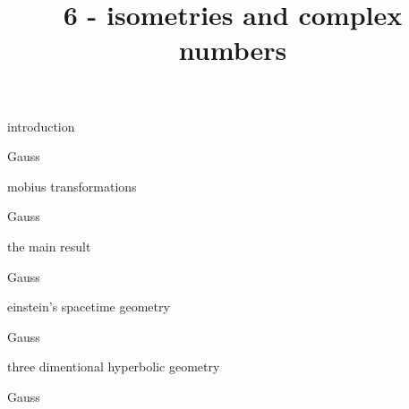 \documentclass{article}
\title{6 - isometries and complex numbers}
\newenvironment{andrew_section}[1]
    {
    \section{#1}
    \begin{itemize}
    }
    {
    \end{itemize}
    }
\begin{document}
\maketitle

\begin{andrew_section}{introduction}
    \item 
        Gauss
\end{andrew_section}

\begin{andrew_section}{mobius transformations}
    \item 
        Gauss
\end{andrew_section}

\begin{andrew_section}{the main result}
    \item 
        Gauss
\end{andrew_section}

\begin{andrew_section}{einstein's spacetime geometry}
    \item 
        Gauss
\end{andrew_section}

\begin{andrew_section}{three dimentional hyperbolic geometry}
    \item 
        Gauss
\end{andrew_section}
\end{document}
